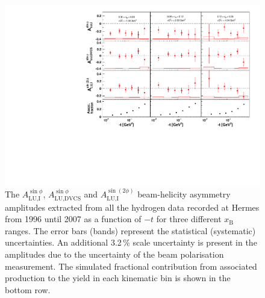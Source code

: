 \begin{figure}
 \begin{center}
 \includegraphics[width=15cm]{bsa_2D}
  \caption{The $A_{\textrm{LU,I}}^{\sin\phi}$, $A_{\textrm{LU,DVCS}}^{\sin\phi}$ and
$A_{\textrm{LU,I}}^{\sin(2\phi)}$ beam-helicity asymmetry amplitudes extracted from all the hydrogen data recorded at H{\sc ermes} from 1996 until 2007 as a function of $-t$ for three different $x_{\textrm{B}}$ ranges. The error bars (bands) represent the statistical (systematic) uncertainties. An additional 3.2\,\% scale uncertainty is present in the amplitudes due to the uncertainty of the beam polarisation measurement. The simulated fractional contribution from associated production to the yield in each kinematic bin is shown in the bottom row.}
  \label{bsa_xbjrange2}
 \end{center}
\end{figure}

